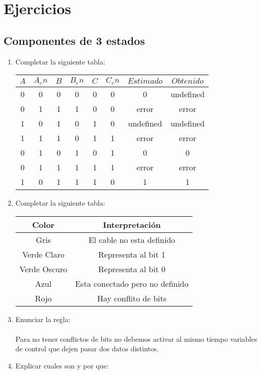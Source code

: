 \documentclass{article}
\title{}
\author{}
\date{}
\begin{document}
\maketitle

\section{Ejercicios}

\subsection{\textbf{Componentes de 3 estados}}
\begin{enumerate}
    \item Completar la siguiente tabla:
    \begin{center}
        \begin{tabular}{c c c c c c|c|c}
            $A$ & $A_en$ & $B$ & $B_en$ & $C$ &$C_en$ & $Estimado$ & $Obtenido$ \\\hline
            0 & 0 & 0 & 0 & 0 & 0 & 0 & undefined \\
            0 & 1 & 1 & 1 & 0 & 0 & error & error \\
            1 & 0 & 1 & 0 & 1 & 0 & undefined & undefined \\
            1 & 1 & 1 & 0 & 1 & 1 & error & error \\
            0 & 1 & 0 & 1 & 0 & 1 & 0 & 0 \\
            0 & 1 & 1 & 1 & 1 & 1 & error & error \\
            1 & 0 & 1 & 1 & 1 & 0 & 1 & 1 \\
        \end{tabular}
    \end{center}
    \item Completar la siguiente tabla:
    \begin{center}{
        \renewcommand{\arraystretch}{1.5}
        \begin{tabular}{c | c}
            Color & Interpretación \\ \hline
            Gris & El cable no esta definido\\ 
            Verde Claro & Representa al bit 1 \\
            Verde Oscuro & Representa al bit 0\\
            Azul & Esta conectado pero no definido\\
            Rojo & Hay conflito de bits\\
        \end{tabular}}
    \end{center}
    \item Enunciar la regla:\\\\
    Para no tener conflictos de bits no debemos activar al mismo tiempo variables de control que dejen pasar dos datos distintos.\\
    \item Explicar cuales son y por que:
\end{enumerate}
\end{document}
